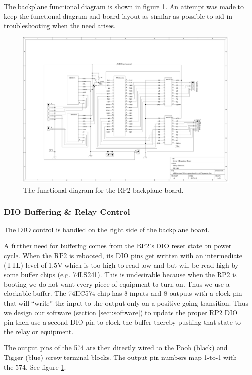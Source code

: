 \documentclass{article}
\begin{document}
The backplane functional diagram is shown in figure \ref{fig:roverBreakout}. An attempt was made to keep the functional diagram and board layout as similar as possible to aid in troubleshooting when the need arises.

\begin{figure}
\centering
\includegraphics[width=1.5\textwidth, angle = 90]{roverBreakout.png}
\caption{The functional diagram for the RP2 backplane board.}
\label{fig:roverBreakout}
\end{figure}

\subsubsection{DIO Buffering \& Relay Control}
The DIO control is handled on the right side of the backplane board.

A further need for buffering comes from the RP2's DIO reset state on power cycle. When the RP2 is rebooted, its DIO pins get written with an intermediate (TTL) level of 1.5V which is too high to read low and but will be read high by some buffer chips (e.g. 74LS241). This is undesirable because when the RP2 is booting we do not want every piece of equipment to turn on. Thus we use a clockable buffer. The 74HC574 chip has 8 inputs and 8 outputs with a clock pin that will ``write'' the input to the output only on a positive going transition. Thus we design our software (section \ref{sect:software}) to update the proper RP2 DIO pin then use a second DIO pin to clock the buffer thereby pushing that state to the relay or equipment.

The output pins of the 574 are then directly wired to the Pooh (black) and Tigger (blue) screw terminal blocks. The output pin numbers map 1-to-1 with the 574. See figure \ref{fig:roverBreakout}.
\end{document}
